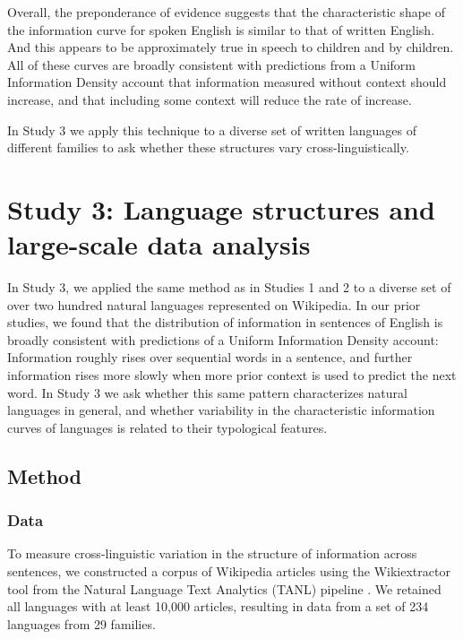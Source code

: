 \documentclass[entropy,article,submit,moreauthors,pdftex]{mdpi}
\begin{document}
Overall, the preponderance of evidence suggests that the characteristic
shape of the information curve for spoken English is similar to that of
written English. And this appears to be approximately true in speech to
children and by children. All of these curves are broadly consistent
with predictions from a Uniform Information Density account that
information measured without context should increase, and that including
some context will reduce the rate of increase.

In Study 3 we apply this technique to a diverse set of written languages
of different families to ask whether these structures vary
cross-linguistically.

\hypertarget{study-3-language-structures-and-large-scale-data-analysis}{%
\section{Study 3: Language structures and large-scale data
analysis}\label{study-3-language-structures-and-large-scale-data-analysis}}

In Study 3, we applied the same method as in Studies 1 and 2 to a
diverse set of over two hundred natural languages represented on
Wikipedia. In our prior studies, we found that the distribution of
information in sentences of English is broadly consistent with
predictions of a Uniform Information Density account: Information
roughly rises over sequential words in a sentence, and further
information rises more slowly when more prior context is used to predict
the next word. In Study 3 we ask whether this same pattern characterizes
natural languages in general, and whether variability in the
characteristic information curves of languages is related to their
typological features.

\hypertarget{method-2}{%
\subsection{Method}\label{method-2}}

\hypertarget{data-2}{%
\subsubsection{Data}\label{data-2}}

To measure cross-linguistic variation in the structure of information
across sentences, we constructed a corpus of Wikipedia articles using
the Wikiextractor tool from the Natural Language Text Analytics (TANL)
pipeline \citep{attardi2010}. We retained all languages with at least
10,000 articles, resulting in data from a set of 234 languages from 29
families.
\end{document}
